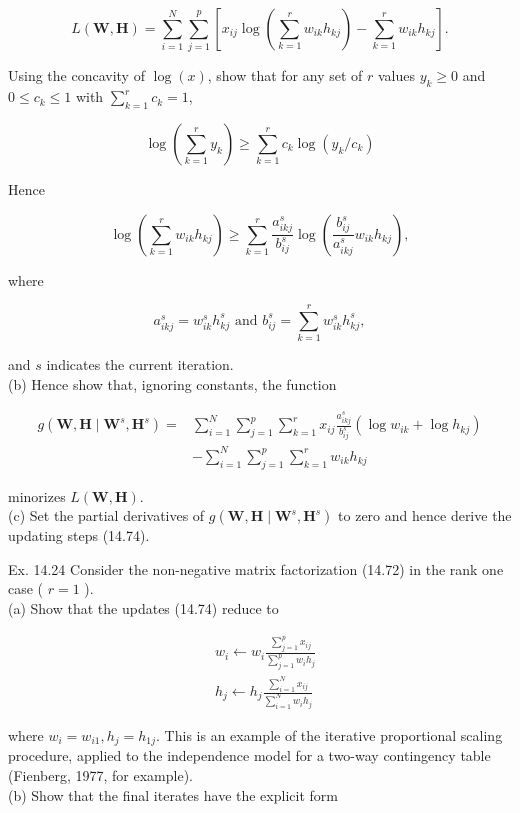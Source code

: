 \documentclass[10pt]{article}
\begin{document}
$$
L(\mathbf{W}, \mathbf{H})=\sum_{i=1}^{N} \sum_{j=1}^{p}\left[x_{i j} \log \left(\sum_{k=1}^{r} w_{i k} h_{k j}\right)-\sum_{k=1}^{r} w_{i k} h_{k j}\right] .
$$

Using the concavity of $\log (x)$, show that for any set of $r$ values $y_{k} \geq 0$ and $0 \leq c_{k} \leq 1$ with $\sum_{k=1}^{r} c_{k}=1$,

$$
\log \left(\sum_{k=1}^{r} y_{k}\right) \geq \sum_{k=1}^{r} c_{k} \log \left(y_{k} / c_{k}\right)
$$

Hence

$$
\log \left(\sum_{k=1}^{r} w_{i k} h_{k j}\right) \geq \sum_{k=1}^{r} \frac{a_{i k j}^{s}}{b_{i j}^{s}} \log \left(\frac{b_{i j}^{s}}{a_{i k j}^{s}} w_{i k} h_{k j}\right),
$$

where

$$
a_{i k j}^{s}=w_{i k}^{s} h_{k j}^{s} \text { and } b_{i j}^{s}=\sum_{k=1}^{r} w_{i k}^{s} h_{k j}^{s},
$$

and $s$ indicates the current iteration.\\
(b) Hence show that, ignoring constants, the function

$$
\begin{aligned}
g\left(\mathbf{W}, \mathbf{H} \mid \mathbf{W}^{s}, \mathbf{H}^{s}\right)= & \sum_{i=1}^{N} \sum_{j=1}^{p} \sum_{k=1}^{r} x_{i j} \frac{a_{i k j}^{s}}{b_{i j}^{s}}\left(\log w_{i k}+\log h_{k j}\right) \\
& -\sum_{i=1}^{N} \sum_{j=1}^{p} \sum_{k=1}^{r} w_{i k} h_{k j}
\end{aligned}
$$

minorizes $L(\mathbf{W}, \mathbf{H})$.\\
(c) Set the partial derivatives of $g\left(\mathbf{W}, \mathbf{H} \mid \mathbf{W}^{s}, \mathbf{H}^{s}\right)$ to zero and hence derive the updating steps (14.74).

Ex. 14.24 Consider the non-negative matrix factorization (14.72) in the rank one case ( $r=1$ ).\\
(a) Show that the updates (14.74) reduce to


\begin{align*}
& w_{i} \leftarrow w_{i} \frac{\sum_{j=1}^{p} x_{i j}}{\sum_{j=1}^{p} w_{i} h_{j}}  \tag{14.121}\\
& h_{j} \leftarrow h_{j} \frac{\sum_{i=1}^{N} x_{i j}}{\sum_{i=1}^{N} w_{i} h_{j}}
\end{align*}


where $w_{i}=w_{i 1}, h_{j}=h_{1 j}$. This is an example of the iterative proportional scaling procedure, applied to the independence model for a two-way contingency table (Fienberg, 1977, for example).\\
(b) Show that the final iterates have the explicit form
\end{document}
